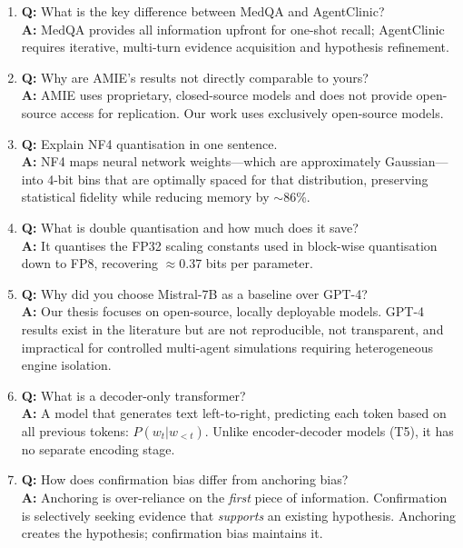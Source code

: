 \begin{vivabox}[\textcolor{white}{Likely Viva Questions}]
\begin{enumerate}
    \item \textbf{Q:} What is the key difference between MedQA and AgentClinic?\\
    \textbf{A:} MedQA provides all information upfront for one-shot recall; AgentClinic requires iterative, multi-turn evidence acquisition and hypothesis refinement.

    \item \textbf{Q:} Why are AMIE's results not directly comparable to yours?\\
    \textbf{A:} AMIE uses proprietary, closed-source models and does not provide open-source access for replication. Our work uses exclusively open-source models.

    \item \textbf{Q:} Explain NF4 quantisation in one sentence.\\
    \textbf{A:} NF4 maps neural network weights---which are approximately Gaussian---into 4-bit bins that are optimally spaced for that distribution, preserving statistical fidelity while reducing memory by $\sim$86\%.

    \item \textbf{Q:} What is double quantisation and how much does it save?\\
    \textbf{A:} It quantises the FP32 scaling constants used in block-wise quantisation down to FP8, recovering $\approx$0.37 bits per parameter.

    \item \textbf{Q:} Why did you choose Mistral-7B as a baseline over GPT-4?\\
    \textbf{A:} Our thesis focuses on open-source, locally deployable models. GPT-4 results exist in the literature but are not reproducible, not transparent, and impractical for controlled multi-agent simulations requiring heterogeneous engine isolation.

    \item \textbf{Q:} What is a decoder-only transformer?\\
    \textbf{A:} A model that generates text left-to-right, predicting each token based on all previous tokens: $P(w_t | w_{<t})$. Unlike encoder-decoder models (T5), it has no separate encoding stage.

    \item \textbf{Q:} How does confirmation bias differ from anchoring bias?\\
    \textbf{A:} Anchoring is over-reliance on the \textit{first} piece of information. Confirmation is selectively seeking evidence that \textit{supports} an existing hypothesis. Anchoring creates the hypothesis; confirmation bias maintains it.
\end{enumerate}
\end{vivabox}
